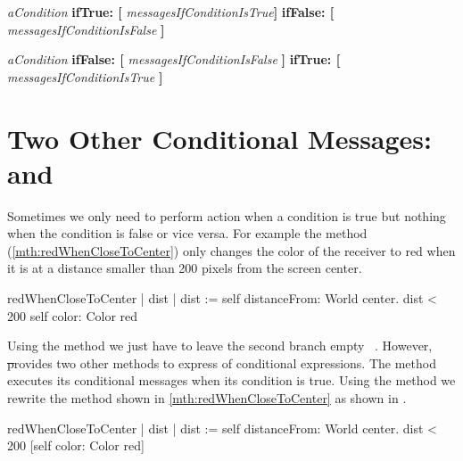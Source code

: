 {\begin{nalltt}
\textit{aCondition}
\quad \textbf{ifTrue: [} \textit{messagesIfConditionIsTrue}\textbf{]}
\quad  \textbf{ifFalse: [} \textit{messagesIfConditionIsFalse} \textbf{]}

\textit{aCondition}
\quad   \textbf{ifFalse: [} \textit{messagesIfConditionIsFalse} \textbf{]}
\quad   \textbf{ifTrue: [} \textit{messagesIfConditionIsTrue} \textbf{]} 
\end{nalltt}


\section{Two Other Conditional Messages:  and }

Sometimes we only need to perform  action when a  condition is true\add{,} but  nothing when the condition is false \add{(} or vice versa\add{)}. For example the method  (\ref{mth:redWhenCloseToCenter}) only changes the color of the receiver to red when it is at a distance smaller than 200 pixels from the screen center.

\begin{method}\label{mth:redWhenCloseToCenter}
redWhenCloseToCenter
   | dist | 
   dist := self distanceFrom: World center.
   dist < 200
      \bold{ifTrue: [}self color: Color red \bold{]}
\end{method}

Using the method  we just have to leave the second branch empty \ie\ \ct{[]}. However, \st provides two other methods  to express  of conditional expressions. The method  executes its conditional messages when its condition is true. Using the method  we rewrite the method  shown in \ref{mth:redWhenCloseToCenter} as shown in .

\begin{method}\label{mth:redWhenCloseToCenter2}
redWhenCloseToCenter
   | dist | 
   dist := self distanceFrom: World  center.
   dist < 200
       [self color: Color red]
\end{method}

}
